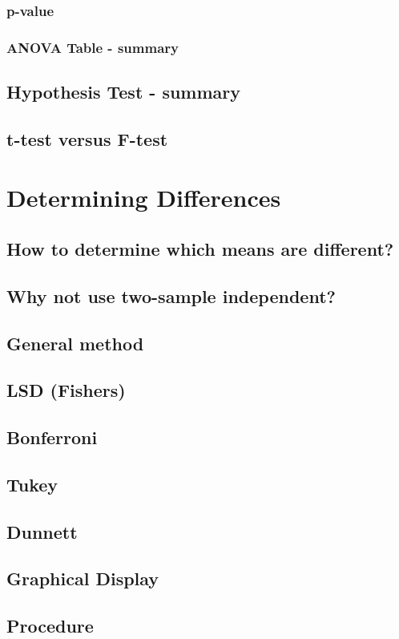 \subsubsection{p-value}  %
\subsubsection{ANOVA Table - summary}  %
\subsection{Hypothesis Test - summary}  %
\subsection{t-test versus F-test}  %

\section{Determining Differences}  %
\subsection{How to determine which means are different?}  %
\subsection{Why not use two-sample independent?}  %
\subsection{General method}  %
\subsection{LSD (Fishers)}  %
\subsection{Bonferroni}  %
\subsection{Tukey}  %
\subsection{Dunnett}  %
\subsection{Graphical Display}  %
\subsection{Procedure}  %
